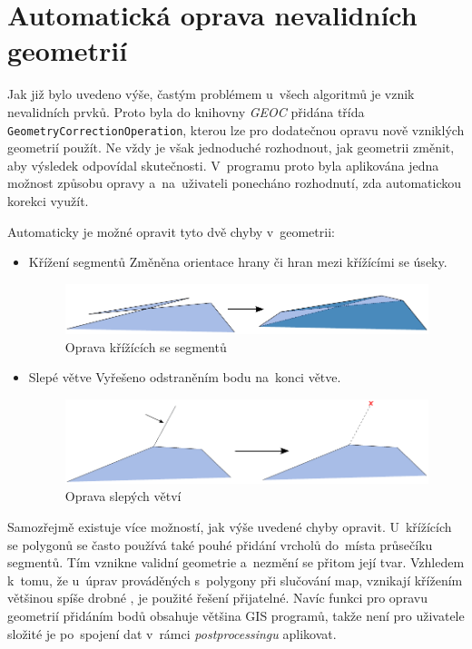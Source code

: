 \section{Automatická oprava nevalidních geometrií}
\label{problemy-opravy}

Jak již bylo uvedeno výše, častým problémem u~všech algoritmů je vznik
nevalidních prvků. Proto byla do knihovny \textit{GEOC} přidána třída
\texttt{Geometry\-Correction\-Operation}, kterou lze pro dodatečnou 
opravu nově vzniklých geometrií použít. Ne vždy je však jednoduché 
rozhodnout, jak geometrii změnit, aby výsledek odpovídal skutečnosti. 
V~programu proto byla aplikována jedna možnost způsobu opravy 
a~na~uživateli ponecháno rozhodnutí, zda automatickou korekci využít.

Automaticky je možné opravit tyto dvě chyby v~geometrii:

\begin{itemize}
 \item Křížení segmentů
	\subitem Změněna orientace hrany či hran mezi křížícími se úseky.
\label{crospic}
  \begin{figure}[hbt]
    \centering
      \includegraphics[width=300pt]{./pictures/crossing.pdf}
      \caption{Oprava křížících se segmentů}
      \label{fig:crossing}
  \end{figure}

 \item Slepé větve
	\subitem Vyřešeno odstraněním bodu na~konci větve.

\label{deadpic}
  \begin{figure}[hbt]
    \centering
      \includegraphics[width=300pt]{./pictures/dead-branch.pdf}
      \caption{Oprava slepých větví}
      \label{fig:dead-branch}
  \end{figure}
\end{itemize}

Samozřejmě existuje více možností, jak výše uvedené chyby opravit.
U~křížících se polygonů se často používá také pouhé přidání vrcholů
do~místa průsečíku segmentů. Tím vznikne validní geometrie a~nezmění
se přitom její tvar. Vzhledem k~tomu, že u~úprav prováděných 
s~polygony při slučování map, vznikají křížením většinou spíše drobné
, je použité řešení přijatelné. Navíc funkci pro opravu
geometrií přidáním bodů obsahuje většina GIS programů, takže není
pro uživatele složité je po~spojení dat v~rámci \textit{postprocessingu}
aplikovat.
